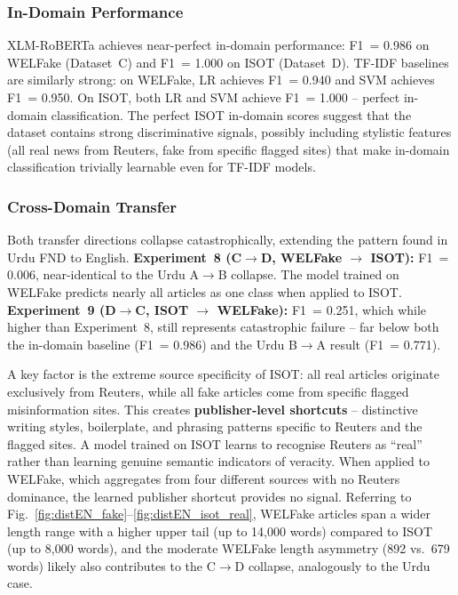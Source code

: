 \documentclass[conference]{IEEEtran}
\begin{document}
\subsubsection{In-Domain Performance}

XLM-RoBERTa achieves near-perfect in-domain performance: F1~= 0.986
on WELFake (Dataset~C) and F1~= 1.000 on ISOT (Dataset~D). TF-IDF
baselines are similarly strong: on WELFake, LR achieves F1~= 0.940
and SVM achieves F1~= 0.950. On ISOT, both LR and SVM achieve
F1~= 1.000 -- perfect in-domain classification. The perfect ISOT
in-domain scores suggest that the dataset contains strong
discriminative signals, possibly including stylistic features (all
real news from Reuters, fake from specific flagged sites) that make
in-domain classification trivially learnable even for TF-IDF models.

\subsubsection{Cross-Domain Transfer}

Both transfer directions collapse catastrophically, extending the
pattern found in Urdu FND to English. \textbf{Experiment~8
(C$\to$D, WELFake $\to$ ISOT):} F1~= 0.006, near-identical to
the Urdu A$\to$B collapse. The model trained on WELFake predicts
nearly all articles as one class when applied to ISOT.
\textbf{Experiment~9 (D$\to$C, ISOT $\to$ WELFake):} F1~= 0.251,
which while higher than Experiment~8, still represents catastrophic
failure -- far below both the in-domain baseline (F1~= 0.986) and
the Urdu B$\to$A result (F1~= 0.771).

A key factor is the extreme source specificity of ISOT: all real
articles originate exclusively from Reuters, while all fake articles
come from specific flagged misinformation sites. This creates
\textbf{publisher-level shortcuts} -- distinctive writing styles,
boilerplate, and phrasing patterns specific to Reuters and the flagged
sites. A model trained on ISOT learns to recognise Reuters as ``real''
rather than learning genuine semantic indicators of veracity. When
applied to WELFake, which aggregates from four different sources with
no Reuters dominance, the learned publisher shortcut provides no
signal. Referring to Fig.~\ref{fig:distEN_fake}--\ref{fig:distEN_isot_real},
WELFake articles span a wider length range with a higher upper tail
(up to 14,000 words) compared to ISOT (up to 8,000 words), and the
moderate WELFake length asymmetry (892 vs.\ 679 words) likely also
contributes to the C$\to$D collapse, analogously to the Urdu case.
\end{document}
